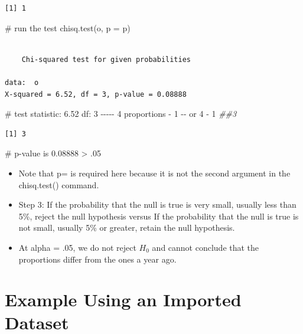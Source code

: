 \documentclass[
  letterpaper,
  DIV=11,
  numbers=noendperiod]{scrreprt}
\newenvironment{Shaded}{\begin{snugshade}}{\end{snugshade}}
\newcommand{\AttributeTok}[1]{\textcolor[rgb]{0.40,0.45,0.13}{#1}}
\newcommand{\CommentTok}[1]{\textcolor[rgb]{0.37,0.37,0.37}{#1}}
\newcommand{\DecValTok}[1]{\textcolor[rgb]{0.68,0.00,0.00}{#1}}
\newcommand{\DocumentationTok}[1]{\textcolor[rgb]{0.37,0.37,0.37}{\textit{#1}}}
\newcommand{\FunctionTok}[1]{\textcolor[rgb]{0.28,0.35,0.67}{#1}}
\newcommand{\NormalTok}[1]{\textcolor[rgb]{0.00,0.23,0.31}{#1}}
\newcommand{\SpecialCharTok}[1]{\textcolor[rgb]{0.37,0.37,0.37}{#1}}
\begin{document}
\begin{verbatim}
[1] 1
\end{verbatim}

\begin{Shaded}
\begin{Highlighting}[]
\CommentTok{\# run the test}
\FunctionTok{chisq.test}\NormalTok{(o, }\AttributeTok{p =}\NormalTok{ p)}
\end{Highlighting}
\end{Shaded}

\begin{verbatim}

    Chi-squared test for given probabilities

data:  o
X-squared = 6.52, df = 3, p-value = 0.08888
\end{verbatim}

\begin{Shaded}
\begin{Highlighting}[]
\CommentTok{\# test statistic: 6.52 df: 3 {-}{-}{-}{-}{-} 4 proportions {-} 1 {-}{-} or}
\DecValTok{4} \SpecialCharTok{{-}} \DecValTok{1}  \DocumentationTok{\#\#3}
\end{Highlighting}
\end{Shaded}

\begin{verbatim}
[1] 3
\end{verbatim}

\begin{Shaded}
\begin{Highlighting}[]
\CommentTok{\# p{-}value is 0.08888 \textgreater{} .05}
\end{Highlighting}
\end{Shaded}

\begin{itemize}
\item
  Note that p= is required here because it is not the second argument in
  the chisq.test() command.
\item
  Step 3: If the probability that the null is true is very small,
  usually less than 5\%, reject the null hypothesis versus If the
  probability that the null is true is not small, usually 5\% or
  greater, retain the null hypothesis.
\item
  At alpha = .05, we do not reject \(H_0\) and cannot conclude that the
  proportions differ from the ones a year ago.
\end{itemize}

\section{Example Using an Imported
Dataset}\label{example-using-an-imported-dataset-1}
\end{document}
